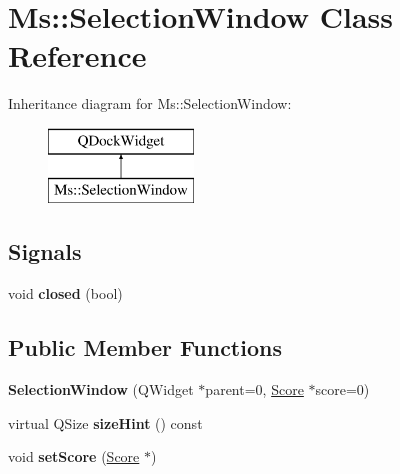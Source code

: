 \hypertarget{class_ms_1_1_selection_window}{}\section{Ms\+:\+:Selection\+Window Class Reference}
\label{class_ms_1_1_selection_window}
Inheritance diagram for Ms\+:\+:Selection\+Window\+:\begin{figure}[H]
\begin{center}
\leavevmode
\includegraphics[height=2.000000cm]{class_ms_1_1_selection_window}
\end{center}
\end{figure}
\subsection*{Signals}
\begin{DoxyCompactItemize}
\item 
\mbox{\label{class_ms_1_1_selection_window_acbda273a3035d3e3ea11ae9d99d46c73}} 
void {\bfseries closed} (bool)
\end{DoxyCompactItemize}
\subsection*{Public Member Functions}
\begin{DoxyCompactItemize}
\item 
\mbox{\label{class_ms_1_1_selection_window_a7a8026c653dce65e2c0d4ed479d02470}} 
{\bfseries Selection\+Window} (Q\+Widget $\ast$parent=0, \hyperlink{class_ms_1_1_score}{Score} $\ast$score=0)
\item 
\mbox{\label{class_ms_1_1_selection_window_a5c8301a315d853ab8aecc423ef0ed64e}} 
virtual Q\+Size {\bfseries size\+Hint} () const
\item 
\mbox{\label{class_ms_1_1_selection_window_a31261087158918a4de28687d56137440}} 
void {\bfseries set\+Score} (\hyperlink{class_ms_1_1_score}{Score} $\ast$)
\end{DoxyCompactItemize}
